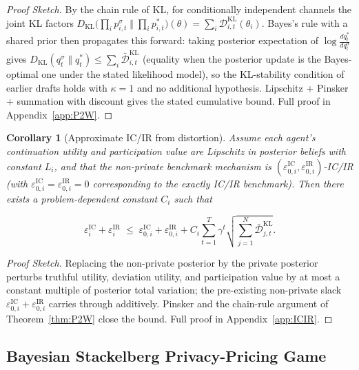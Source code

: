\documentclass{article}
\newtheorem{corollary}{Corollary}
\begin{document}
\begin{proof}
    [Proof Sketch]
    By the chain rule of KL, for conditionally independent channels the joint KL factors $D_{\mathrm{KL}}\!\big(\textstyle\prod_i p_{i,t}^\sigma \;\Vert\; \prod_i p_{i,t}^*\big)(\theta) = \sum_i \mathcal{D}_{i,t}^{\mathrm{KL}}(\theta_i).$ Bayes's rule with a shared prior then propagates this forward: taking posterior expectation of $\log\frac{dq_t^*}{dq_t^\sigma}$ gives $D_{\mathrm{KL}}(q_t^\sigma \| q_t^*) \le \sum_i \bar{\mathcal D}_{i,t}^{\mathrm{KL}}$ (equality when the posterior update is the Bayes-optimal one under the stated likelihood model), so the KL-stability condition of earlier drafts holds with $\kappa = 1$ and no additional hypothesis. Lipschitz + Pinsker + summation with discount gives the stated cumulative bound. Full proof in Appendix~\ref{app:P2W}.
\end{proof}

\begin{corollary}
    [Approximate IC/IR from distortion]
    \label{cor:ICIR}
    Assume each agent's continuation utility and participation value are Lipschitz in posterior beliefs with constant $L_i$, and that the non-private benchmark mechanism is $(\varepsilon_{0,i}^{\mathrm{IC}}, \varepsilon_{0,i}^{\mathrm{IR}})$-IC/IR (with $\varepsilon_{0,i}^{\mathrm{IC}} = \varepsilon_{0,i}^{\mathrm{IR}} = 0$ corresponding to the exactly IC/IR benchmark). Then there exists a problem-dependent constant $C_i$ such that

    $$\varepsilon_i^{\mathrm{IC}} + \varepsilon_i^{\mathrm{IR}} \;\le\; \varepsilon_{0,i}^{\mathrm{IC}} + \varepsilon_{0,i}^{\mathrm{IR}} + C_i \sum_{t=1}^T \gamma^t \sqrt{\sum_{j=1}^N \bar{\mathcal{D}}_{j,t}^{\mathrm{KL}}}.$$
\end{corollary}

\begin{proof}
    [Proof Sketch]
    Replacing the non-private posterior by the private posterior perturbs truthful utility, deviation utility, and participation value by at most a constant multiple of posterior total variation; the pre-existing non-private slack $\varepsilon_{0,i}^{\mathrm{IC}} + \varepsilon_{0,i}^{\mathrm{IR}}$ carries through additively. Pinsker and the chain-rule argument of Theorem~\ref{thm:P2W} close the bound. Full proof in Appendix~\ref{app:ICIR}.
\end{proof}


\subsection{Bayesian Stackelberg Privacy-Pricing Game}
\label{sec:stackleberg}
\end{document}
